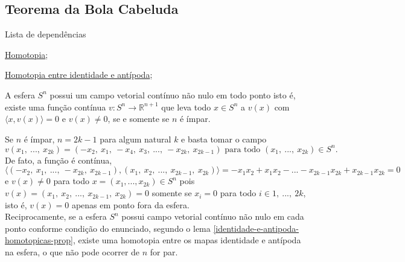 \subsection{Teorema da Bola Cabeluda} %
\label{teorema-bola-cabeluda-prop}
\begin{titlemize}{Lista de dependências}
	\item \hyperref[homotopia-def]{Homotopia};\\ %
	\item \hyperref[identidade-e-antipoda-homotopicas-prop]{Homotopia entre identidade e antípoda};\\
\end{titlemize}


\begin{thm}[Teorema da Bola Cabeluda]%
	A esfera $S^n$ possui um campo vetorial contínuo não nulo em todo ponto isto é, existe uma função contínua $v:S^n\rightarrow \mathbb{R}^{n+1}$ que leva todo $x\in S^n$ a $v(x)$ com $\langle x, v(x) \rangle =0$ e $v(x)\ne 0$, se e somente se $n$ é ímpar.\\
\end{thm}
\begin{dem}
    Se $n$ é ímpar, $n=2k-1$ para algum natural $k$ e basta tomar o campo $$v(x_1,~...,~x_{2k})=(-x_2,~x_1,~-x_4,~x_3,~...,~-x_{2k},~x_{2k-1})\text{ para todo }(x_1,~...,~x_{2k})\in S^n.$$
    De fato, a função é contínua, $\langle(-x_2,~x_1,~...,~-x_{2k},~x_{2k-1}), (x_1,~x_2,~...,~x_{2k-1},~x_{2k}) \rangle =-x_1x_2+x_1x_2-...-x_{2k-1}x_{2k}+x_{2k-1}x_{2k}=0$ e $v(x)\ne 0$ para todo $x=(x_1,...,x_{2k})\in S^n$ pois $v(x)=(x_1,~x_2,~...,~x_{2k-1},~x_{2k})=0$ somente se $x_i=0$ para todo $i\in {1,~...,~2k}$, isto é, $v(x)=0$ apenas em ponto fora da esfera.\\

    Reciprocamente, se a esfera $S^n$ possui campo vetorial contínuo não nulo em cada ponto conforme condição do enunciado, segundo o lema \ref{identidade-e-antipoda-homotopicas-prop}, existe uma homotopia entre os mapas identidade e antípoda na esfera, o que não pode ocorrer de $n$ for par.

    
\end{dem}

